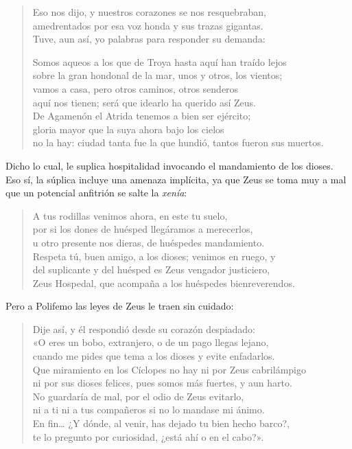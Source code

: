 \documentclass[11pt,a4paper]{article}
\begin{document}
\begin{verse}
Eso nos dijo, y nuestros corazones se nos resquebraban,\\
amedrentados por esa voz honda y sus trazas gigantas.\\
Tuve, aun así, yo palabras para responder su demanda:

Somos aqueos a los que de Troya hasta aquí han traído lejos\\
sobre la gran hondonal de la mar, unos y otros, los vientos;\\
vamos a casa, pero otros caminos, otros senderos\\
aquí nos tienen; será que idearlo ha querido así Zeus.\\
De Agamenón el Atrida tenemos a bien ser ejército;\\
gloria mayor que la suya ahora bajo los cielos\\
no la hay: ciudad tanta fue la que hundió, tantos fueron sus muertos.
\end{verse}

Dicho lo cual, le suplica hospitalidad invocando el mandamiento de los dioses. Eso sí, la súplica incluye una amenaza implícita, ya que Zeus se toma muy a mal que un potencial anfitrión se salte la \emph{xenía}:

\begin{verse}
A tus rodillas venimos ahora, en este tu suelo,\\
por si los dones de huésped llegáramos a merecerlos,\\
u otro presente nos dieras, de huéspedes mandamiento.\\
Respeta tú, buen amigo, a los dioses; venimos en ruego, y\\
del suplicante y del huésped es Zeus vengador justiciero,\\
Zeus Hospedal, que acompaña a los huéspedes bienreverendos.
\end{verse}

Pero a Polifemo las leyes de Zeus le traen sin cuidado:

\begin{verse}
Dije así, y él respondió desde su corazón despiadado:\\
«O eres un bobo, extranjero, o de un pago llegas lejano,\\
cuando me pides que tema a los dioses y evite enfadarlos.\\
Que miramiento en los Cíclopes no hay ni por Zeus cabrilámpigo\\
ni por sus dioses felices, pues somos más fuertes, y aun harto.\\
No guardaría de mal, por el odio de Zeus evitarlo,\\
ni a ti ni a tus compañeros si no lo mandase mi ánimo.\\
En fin… ¿Y dónde, al venir, has dejado tu bien hecho barco?,\\
te lo pregunto por curiosidad, ¿está ahí o en el cabo?».
\end{verse}
\end{document}
